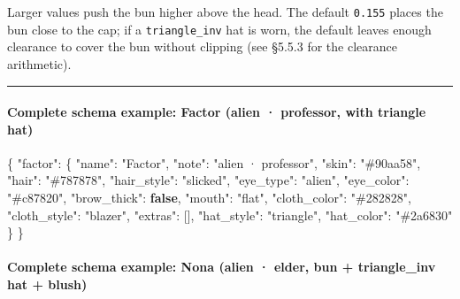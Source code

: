 \documentclass[
  12pt,
  letterpaper,
]{book}
\newenvironment{Shaded}{}{}
\newcommand{\DataTypeTok}[1]{\textcolor[rgb]{0.56,0.13,0.00}{#1}}
\newcommand{\FunctionTok}[1]{\textcolor[rgb]{0.02,0.16,0.49}{#1}}
\newcommand{\KeywordTok}[1]{\textcolor[rgb]{0.00,0.44,0.13}{\textbf{#1}}}
\newcommand{\OtherTok}[1]{\textcolor[rgb]{0.00,0.44,0.13}{#1}}
\newcommand{\StringTok}[1]{\textcolor[rgb]{0.25,0.44,0.63}{#1}}
\begin{document}
Larger values push the bun higher above the head. The default
\texttt{0.155} places the bun close to the cap; if a
\texttt{triangle\_inv} hat is worn, the default leaves enough clearance
to cover the bun without clipping (see §5.5.3 for the clearance
arithmetic).

\begin{center}\rule{0.5\linewidth}{0.5pt}\end{center}

\paragraph{Complete schema example: Factor (alien · professor, with
triangle
hat)}\label{complete-schema-example-factor-alien-professor-with-triangle-hat}

\begin{Shaded}
\begin{Highlighting}[]
\FunctionTok{\{}
  \DataTypeTok{"factor"}\FunctionTok{:} \FunctionTok{\{}
    \DataTypeTok{"name"}\FunctionTok{:}        \StringTok{"Factor"}\FunctionTok{,}
    \DataTypeTok{"note"}\FunctionTok{:}        \StringTok{"alien · professor"}\FunctionTok{,}
    \DataTypeTok{"skin"}\FunctionTok{:}        \StringTok{"\#90aa58"}\FunctionTok{,}
    \DataTypeTok{"hair"}\FunctionTok{:}        \StringTok{"\#787878"}\FunctionTok{,}
    \DataTypeTok{"hair\_style"}\FunctionTok{:}  \StringTok{"slicked"}\FunctionTok{,}
    \DataTypeTok{"eye\_type"}\FunctionTok{:}    \StringTok{"alien"}\FunctionTok{,}
    \DataTypeTok{"eye\_color"}\FunctionTok{:}   \StringTok{"\#c87820"}\FunctionTok{,}
    \DataTypeTok{"brow\_thick"}\FunctionTok{:}  \KeywordTok{false}\FunctionTok{,}
    \DataTypeTok{"mouth"}\FunctionTok{:}       \StringTok{"flat"}\FunctionTok{,}
    \DataTypeTok{"cloth\_color"}\FunctionTok{:} \StringTok{"\#282828"}\FunctionTok{,}
    \DataTypeTok{"cloth\_style"}\FunctionTok{:} \StringTok{"blazer"}\FunctionTok{,}
    \DataTypeTok{"extras"}\FunctionTok{:}      \OtherTok{[]}\FunctionTok{,}
    \DataTypeTok{"hat\_style"}\FunctionTok{:}   \StringTok{"triangle"}\FunctionTok{,}
    \DataTypeTok{"hat\_color"}\FunctionTok{:}   \StringTok{"\#2a6830"}
  \FunctionTok{\}}
\FunctionTok{\}}
\end{Highlighting}
\end{Shaded}

\paragraph{Complete schema example: Nona (alien · elder, bun +
triangle\_inv hat +
blush)}\label{complete-schema-example-nona-alien-elder-bun-triangle_inv-hat-blush}
\end{document}
